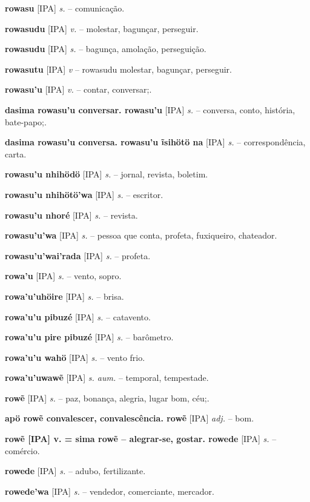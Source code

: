 \textbf{rowasu} [IPA] \textit{s.} -- comunicação.

\textbf{rowasudu} [IPA] \textit{v.} -- molestar, bagunçar, perseguir.

\textbf{rowasudu} [IPA] \textit{s.} -- bagunça, amolação, perseguição.

\textbf{rowasutu} [IPA] \textit{v} -- rowasudu molestar, bagunçar, perseguir.

\textbf{rowasu'u} [IPA] \textit{v.} -- contar, conversar;.

\textbf{dasima rowasu'u conversar. rowasu'u} [IPA] \textit{s.} -- conversa, conto, história, bate-papo;.

\textbf{dasima rowasu'u conversa. rowasu'u ĩsihötö na} [IPA] \textit{s.} -- correspondência, carta.

\textbf{rowasu'u nhihödö} [IPA] \textit{s.} -- jornal, revista, boletim.

\textbf{rowasu'u nhihötö'wa} [IPA] \textit{s.} -- escritor.

\textbf{rowasu'u nhoré} [IPA] \textit{s.} -- revista.

\textbf{rowasu'u'wa} [IPA] \textit{s.} -- pessoa que conta, profeta, fuxiqueiro, chateador.

\textbf{rowasu'u'wai'rada} [IPA] \textit{s.} -- profeta.

\textbf{rowa'u} [IPA] \textit{s.} -- vento, sopro. \href{https://xavante.pythonanywhere.com/static/dicionario/play.html?file=wind.wav}{\faHeadphones}

\textbf{rowa'u'uhöire} [IPA] \textit{s.} -- brisa.

\textbf{rowa'u'u pibuzé} [IPA] \textit{s.} -- catavento.

\textbf{rowa'u'u pire pibuzé} [IPA] \textit{s.} -- barômetro.

\textbf{rowa'u'u wahö} [IPA] \textit{s.} -- vento frio.

\textbf{rowa'u'uwawẽ} [IPA] \textit{s. aum.} -- temporal, tempestade.

\textbf{rowẽ} [IPA] \textit{s.} -- paz, bonança, alegria, lugar bom, céu;.

\textbf{apö rowẽ convalescer, convalescência. rowẽ} [IPA] \textit{adj.} -- bom.

\textbf{rowẽ [IPA] v. = sima rowẽ -- alegrar-se, gostar. rowede} [IPA] \textit{s.} -- comércio.

\textbf{rowede} [IPA] \textit{s.} -- adubo, fertilizante.

\textbf{rowede'wa} [IPA] \textit{s.} -- vendedor, comerciante, mercador.

